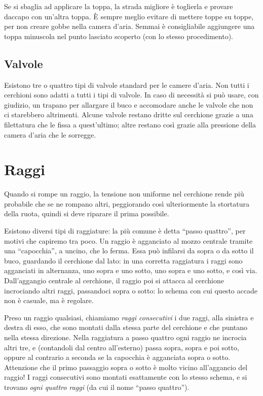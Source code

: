 Se si sbaglia ad applicare la toppa, la strada migliore è toglierla e provare daccapo con un'altra toppa.
È sempre meglio evitare di mettere toppe su toppe, per non creare gobbe nella camera d'aria.
Semmai è consigliabile aggiungere una toppa minuscola nel punto lasciato scoperto (con lo stesso procedimento).

\subsection*{Valvole}
Esistono tre o quattro tipi di valvole standard per le camere d'aria.
Non tutti i cerchioni sono adatti a tutti i tipi di valvole.
In caso di necessità si può usare, con giudizio, un trapano per allargare il buco e accomodare anche le valvole che non ci starebbero altrimenti.
Alcune valvole restano dritte sul cerchione grazie a una filettatura che le fissa a quest'ultimo; altre restano così grazie alla pressione della camera d'aria che le sorregge.

\section{Raggi}
Quando si rompe un raggio, la tensione non uniforme nel cerchione rende più probabile che se ne rompano altri, peggiorando così ulteriormente la stortatura della ruota, quindi si deve riparare il prima possibile.

Esistono diversi tipi di raggiature: la più comune è detta ``passo quattro'', per motivi che capiremo tra poco.
Un raggio è agganciato al mozzo centrale %
tramite una ``capocchia'', a uncino, che lo ferma.
Essa può infilarsi da sopra o da sotto il buco, guardando il cerchione dal lato: in una corretta raggiatura i raggi sono agganciati in alternanza, uno sopra e uno sotto, uno sopra e uno sotto, e così via.
Dall'aggangio centrale al cerchione, il raggio poi si attacca al cerchione incrociando altri raggi, passandoci sopra o sotto: lo schema con cui questo accade non è casuale, ma è regolare.

Preso un raggio qualsiasi, chiamiamo \emph{raggi consecutivi} i due raggi, alla sinistra e destra di esso, che sono montati dalla stessa parte del cerchione e che puntano nella stessa direzione.
Nella raggiatura a passo quattro ogni raggio ne incrocia altri tre, e (contandoli dal centro all'esterno) passa sopra, sopra e poi sotto, oppure al contrario a seconda se la capocchia è agganciata sopra o sotto.
Attenzione che il primo passaggio sopra o sotto è molto vicino all'aggancio del raggio!
I raggi consecutivi sono montati esattamente con lo stesso schema, e si trovano \emph{ogni quattro raggi} (da cui il nome ``passo quattro'').

